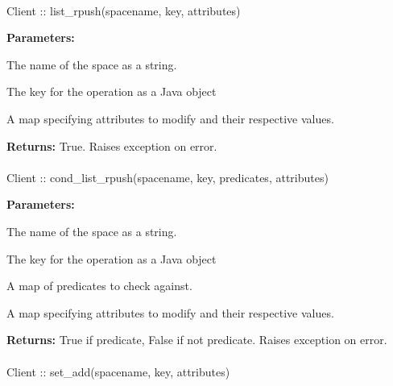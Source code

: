 \paragraph{}
\label{api:java:list_rpush}
\begin{javacode}
Client :: list_rpush(spacename, key, attributes)
\end{javacode}
\funcdesc 

\noindent\textbf{Parameters:}
\begin{description}[labelindent=\widthof{{\code{attributes}}},leftmargin=*,noitemsep,nolistsep,align=right]
\item[\code{spacename}] The name of the space as a string.
\item[\code{key}] The key for the operation as a Java object
\item[\code{attributes}] A map specifying attributes to modify and their respective values.
\end{description}

\noindent\textbf{Returns:}
True.  Raises exception on error.

\paragraph{}
\label{api:java:cond_list_rpush}
\begin{javacode}
Client :: cond_list_rpush(spacename, key, predicates, attributes)
\end{javacode}
\funcdesc 

\noindent\textbf{Parameters:}
\begin{description}[labelindent=\widthof{{\code{predicates}}},leftmargin=*,noitemsep,nolistsep,align=right]
\item[\code{spacename}] The name of the space as a string.
\item[\code{key}] The key for the operation as a Java object
\item[\code{predicates}] A map of predicates to check against.
\item[\code{attributes}] A map specifying attributes to modify and their respective values.
\end{description}

\noindent\textbf{Returns:}
True if predicate, False if not predicate.  Raises exception on error.

\paragraph{}
\label{api:java:set_add}
\begin{javacode}
Client :: set_add(spacename, key, attributes)
\end{javacode}
\funcdesc 

